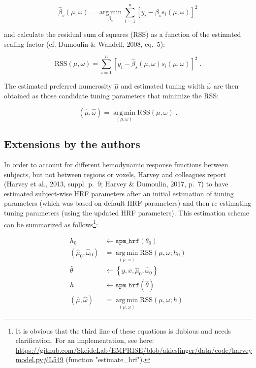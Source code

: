 \documentclass[a4paper,12pt]{article}
\begin{document}
\begin{equation} \label{eq:bs-est}
\hat{\beta}_s(\mu,\omega) = \operatorname*{arg\,min}_{\beta_s} \sum_{i=1}^{n} \left[ y_i - \beta_s s_i(\mu,\omega) \right]^2
\end{equation}

and calculate the residual sum of squares (RSS) as a function of the estimated scaling factor (cf. Dumoulin \& Wandell, 2008, eq.~5):

\begin{equation} \label{eq:RSS}
\mathrm{RSS}(\mu,\omega) = \sum_{i=1}^{n} \left[ y_i - \hat{\beta}_s(\mu,\omega) s_i(\mu,\omega) \right]^2 \; .
\end{equation}

The estimated preferred numerosity $\hat{\mu}$ and estimated tuning width $\hat{\omega}$ are then obtained as those candidate tuning parameters that minimize the RSS:

\begin{equation} \label{eq:mu-tw-est}
(\hat{\mu},\hat{\omega}) = \operatorname*{arg\,min}_{(\mu,\omega)} \mathrm{RSS}(\mu,\omega) \; .
\end{equation}


\subsection{Extensions by the authors}

In order to account for different hemodynamic response functions between subjects, but not between regions or voxels, Harvey and colleagues report (Harvey et al., 2013, suppl. p.~9; Harvey \& Dumoulin, 2017, p.~7) to have estimated subject-wise HRF parameters after an initial estimation of tuning parameters (which was based on default HRF parameters) and then re-estimating tuning parameters (using the updated HRF parameters). This estimation scheme can be summarized as follows\footnote{It is obvious that the third line of these equations is dubious and needs clarification. For an implementation, see here: \url{https://github.com/SkeideLab/EMPRISE/blob/akieslinger/data/code/harveymodel.py#L549} (function "estimate\_hrf").}:

\begin{equation} \label{eq:Harvey}
\begin{split}
h_0 &\leftarrow \mathtt{spm\_hrf}(\theta_0) \\
(\hat{\mu}_0,\hat{\omega}_0) &= \operatorname*{arg\,min}_{(\mu,\omega)} \mathrm{RSS}(\mu,\omega;h_0) \\
\hat{\theta} &\leftarrow \left\lbrace y, x, \hat{\mu}_0, \hat{\omega}_0 \right\rbrace \\
h &\leftarrow \mathtt{spm\_hrf}(\hat{\theta}) \\
(\hat{\mu},\hat{\omega}) &= \operatorname*{arg\,min}_{(\mu,\omega)} \mathrm{RSS}(\mu,\omega;h)
\end{split}
\end{equation}
\end{document}
